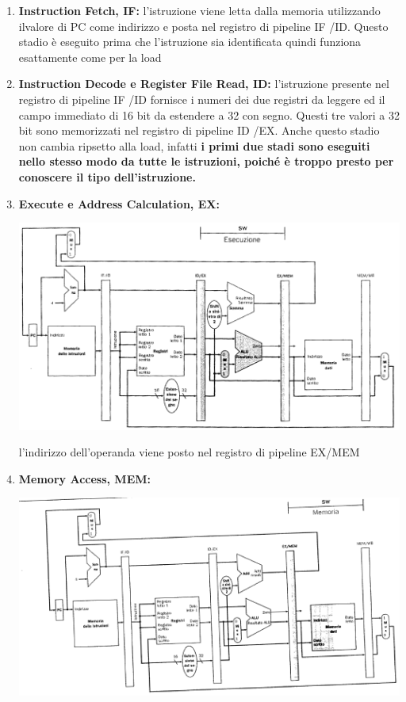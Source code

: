 \documentclass[a4paper,12pt, oneside]{book}
\begin{document}
\begin{enumerate}
  \item \textbf{Instruction Fetch, IF:} l'istruzione viene letta dalla
  memoria utilizzando ilvalore di PC come indirizzo e posta nel
  registro di pipeline IF /ID. Questo stadio è eseguito prima
  che l'istruzione sia identificata quindi funziona esattamente come
  per la load
  \item \textbf{Instruction Decode e Register File Read, ID:}
  l'istruzione presente nel registro di pipeline IF /ID fornisce i
  numeri dei due registri da leggere ed il campo immediato di 16 bit
  da estendere a 32 con segno. Questi tre valori a 32 bit sono
  memorizzati nel registro di pipeline ID /EX. Anche questo stadio non
  cambia ripsetto alla load, infatti \textbf{i primi due stadi sono
    eseguiti nello stesso modo da tutte le istruzioni,
    poiché è troppo presto per conoscere il tipo
    dell'istruzione.}
  \item \textbf{Execute e Address Calculation, EX:}
  \begin{center}
    \includegraphics[scale = 0.7]{img/pipe9.png}
  \end{center}
  l'indirizzo dell'operanda viene posto nel registro di pipeline EX/MEM
  \item \textbf{Memory Access, MEM:}
  \begin{center}
    \includegraphics[scale = 0.7]{img/pipe10.png}

\end{center}
\end{enumerate}
\end{document}
